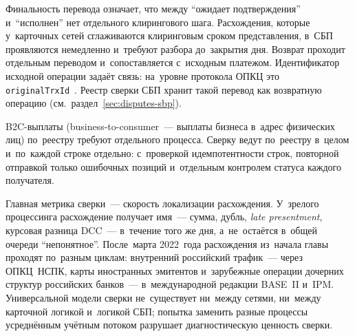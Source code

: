 Финальность перевода означает, что между \enquote{ожидает подтверждения}
и~\enquote{исполнен} нет отдельного клирингового шага. Расхождения, которые
у~карточных сетей сглаживаются клиринговым сроком представления, в~СБП
проявляются немедленно и~требуют разбора до~закрытия дня. Возврат проходит
отдельным переводом и~сопоставляется с~исходным платежом. Идентификатор исходной
операции задаёт связь: на~уровне протокола ОПКЦ это \texttt{originalTrxId}~\cite{nspk-sbp-openapi}. Реестр
сверки СБП хранит такой перевод как возвратную операцию
(см.~раздел~\ref{sec:disputes-sbp}).

B2C-выплаты (business-to-consumer~--- выплаты бизнеса в~адрес физических лиц)
по~реестру требуют отдельного процесса. Сверку ведут по~реестру в~целом
и~по~каждой строке отдельно: с~проверкой идемпотентности строк, повторной
отправкой только ошибочных позиций и~отдельным контролем статуса каждого
получателя.


Главная метрика сверки~--- скорость локализации расхождения. У~зрелого
процессинга расхождение получает имя~--- сумма, дубль, \textit{late
presentment}, курсовая разница DCC~--- в~течение того же дня, а~не~остаётся
в~общей очереди \enquote{непонятное}. После~марта 2022~года расхождения из~начала главы проходят по~разным циклам: внутренний российский трафик~---
через ОПКЦ~НСПК, карты иностранных эмитентов и~зарубежные операции дочерних
структур российских банков~--- в~международной редакции BASE~II и~IPM.
Универсальной модели сверки не~существует ни~между сетями, ни~между карточной логикой
и~логикой СБП; попытка заменить разные процессы усреднённым учётным потоком
разрушает диагностическую ценность сверки.
